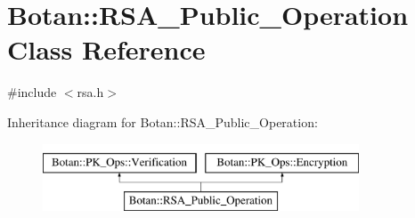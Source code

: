 \hypertarget{classBotan_1_1RSA__Public__Operation}{\section{Botan\-:\-:R\-S\-A\-\_\-\-Public\-\_\-\-Operation Class Reference}
\label{classBotan_1_1RSA__Public__Operation}
}


{\ttfamily \#include $<$rsa.\-h$>$}

Inheritance diagram for Botan\-:\-:R\-S\-A\-\_\-\-Public\-\_\-\-Operation\-:\begin{figure}[H]
\begin{center}
\leavevmode
\includegraphics[height=2.000000cm]{classBotan_1_1RSA__Public__Operation}
\end{center}
\end{figure}
